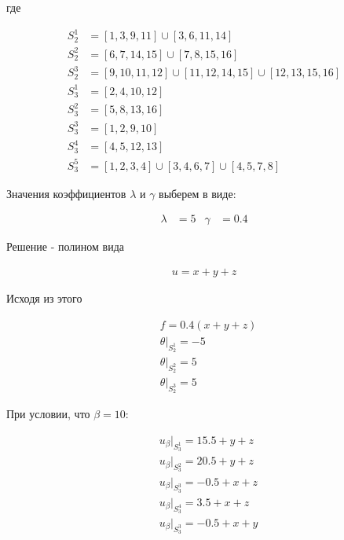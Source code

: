 \documentclass[12pt, a4paper]{article}
\begin{document}
\vspace{5mm}

\noindent где

\vspace{5mm}
\begin{align*}
  S_2^1 &= 
          \left[ 1, 3, 9, 11 \right] 
    \cup  \left[ 3, 6, 11, 14 \right] \\
  S_2^2 &= 
          \left[ 6, 7, 14, 15 \right] 
    \cup  \left[ 7, 8, 15, 16 \right] \\
  S_2^3 &= 
          \left[ 9, 10, 11, 12 \right] 
    \cup  \left[ 11, 12, 14, 15 \right]
    \cup  \left[ 12, 13, 15, 16 \right] \\
  S_3^1 &= 
          \left[ 2, 4, 10, 12 \right] \\
  S_3^2 &=
          \left[ 5, 8, 13, 16 \right] \\
  S_3^3 &= 
          \left[ 1, 2, 9, 10 \right] \\
  S_3^4 &=
          \left[ 4, 5, 12, 13 \right] \\
  S_3^5 &= 
          \left[ 1, 2, 3, 4 \right] 
    \cup  \left[ 3, 4, 6, 7 \right]
    \cup  \left[ 4, 5, 7, 8 \right]
\end{align*}
\vspace{2mm}

\noindent Значения коэффициентов $\lambda$ и $\gamma$ выберем в виде:

\begin{align*}
  \lambda &= 5 & \gamma &= 0.4
\end{align*}

\noindent Решение - полином вида

\begin{align*}
  u = x + y + z
\end{align*}

\noindent Исходя из этого

\begin{align*}
  &f = 0.4(x + y + z) \\[1ex]
  &\theta|_{S_2^1} = -5 \\[1ex]
  &\theta|_{S_2^2} = 5 \\[1ex]
  &\theta|_{S_2^3} = 5
\end{align*}

\noindent При условии, что $\beta = 10$:

\begin{align*}
  &u_{\beta}|_{S_3^1} = 15.5 + y + z \\[1ex]
  &u_{\beta}|_{S_3^2} = 20.5 + y + z \\[1ex]
  &u_{\beta}|_{S_3^3} = -0.5 + x + z \\[1ex]
  &u_{\beta}|_{S_3^4} = 3.5 + x + z \\[1ex]
  &u_{\beta}|_{S_3^3} = -0.5 + x + y
\end{align*}
\end{document}
